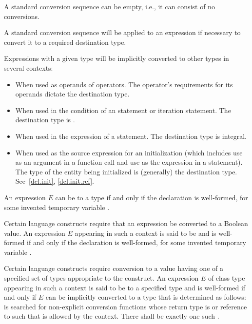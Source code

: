 \begin{note}
A standard conversion sequence can be empty, i.e., it can consist of no
conversions.
\end{note}
A standard conversion sequence will be applied to
an expression if necessary to convert it to a required destination type.

\pnum
\begin{note}
Expressions with a given type will be implicitly converted to other
types in several contexts:

\begin{itemize}
\item When used as operands of operators. The operator's requirements
for its operands dictate the destination type.

\item When used in the condition of an  statement or
iteration statement. The destination type is
.

\item When used in the expression of a  statement.
The destination type is integral.

\item When used as the source expression for an initialization (which
includes use as an argument in a function call and use as the expression
in a  statement). The type of the entity being initialized
is (generally) the destination type.
See~\ref{dcl.init}, \ref{dcl.init.ref}.
\end{itemize}
\end{note}

\pnum
An expression $E$ can be
 to a type  if and only if the
declaration  is well-formed, for some invented temporary
variable .

\pnum
Certain language constructs require that an expression be converted to a Boolean
value. An expression $E$ appearing in such a context is said to be
 and is well-formed if and only if
the declaration  is well-formed, for some invented temporary
variable .

\pnum
Certain language constructs require conversion to a value having
one of a specified set of types appropriate to the construct. An
expression $E$ of class type  appearing in such a
context is said to be
%
 to a specified type  and is
well-formed if and only if $E$ can be implicitly converted to a type 
that is determined as follows:
 is searched for non-explicit conversion functions
whose return type is \cv{}  or reference to \cv{}
 such that  is allowed by the context.
There shall be exactly one such .

